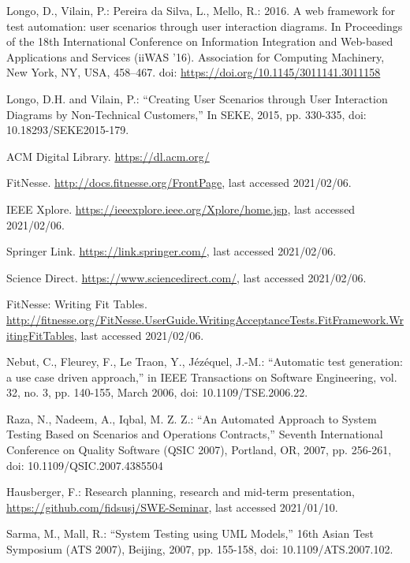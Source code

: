 \documentclass[a4paper,10pt, bibliography=totocnumbered]{scrreprt}
\begin{document}
\begin{thebibliography}{9}
 Longo, D., Vilain, P.: Pereira da Silva, L., Mello, R.: 2016. A web framework for test automation: user scenarios through user interaction diagrams. In Proceedings of the 18th International Conference on Information Integration and Web-based Applications and Services (iiWAS '16). Association for Computing Machinery, New York, NY, USA, 458–467. doi: \url{https://doi.org/10.1145/3011141.3011158}

 Longo, D.H. and Vilain, P.: \enquote{Creating User Scenarios through User Interaction Diagrams by Non-Technical Customers,} In SEKE, 2015, pp. 330-335, doi: 10.18293/SEKE2015-179.

 ACM Digital Library. \url{https://dl.acm.org/} 

 FitNesse. \url{http://docs.fitnesse.org/FrontPage}, last accessed 2021/02/06.

 IEEE Xplore. \url{https://ieeexplore.ieee.org/Xplore/home.jsp}, last accessed 2021/02/06.

 Springer Link. \url{https://link.springer.com/}, last accessed 2021/02/06.

 Science Direct. \url{https://www.sciencedirect.com/}, last accessed 2021/02/06.

 FitNesse: Writing Fit Tables. \url{http://fitnesse.org/FitNesse.UserGuide.WritingAcceptanceTests.FitFramework.WritingFitTables}, last accessed 2021/02/06.


 Nebut, C., Fleurey, F., Le Traon, Y., Jézéquel, J.-M.: \enquote{Automatic test generation: a use case driven approach,} in IEEE Transactions on Software Engineering, vol. 32, no. 3, pp. 140-155, March 2006, doi: 10.1109/TSE.2006.22.

 Raza, N., Nadeem, A., Iqbal, M. Z. Z.: \enquote{An Automated Approach to System Testing Based on Scenarios and Operations Contracts,} Seventh International Conference on Quality Software (QSIC 2007), Portland, OR, 2007, pp. 256-261, doi: 10.1109/QSIC.2007.4385504

 Hausberger, F.: Research planning, research and mid-term presentation, \url{https://github.com/fidsusj/SWE-Seminar}, last accessed 2021/01/10.

 Sarma, M., Mall, R.: \enquote{System Testing using UML Models,} 16th Asian Test Symposium (ATS 2007), Beijing, 2007, pp. 155-158, doi: 10.1109/ATS.2007.102.


\end{thebibliography}
\end{document}
